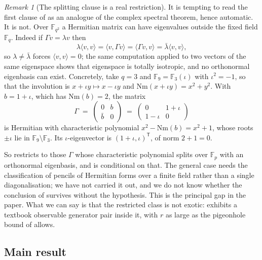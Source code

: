 \documentclass{ceurart}
\theoremstyle{plain}
\theoremstyle{definition}
\theoremstyle{remark}
\newtheorem{remark}[theorem]{Remark}
\theoremstyle{plain}
\newcommand{\inner}[2]{\langle #1, #2\rangle}
\newcommand{\FF}{\mathbb{F}}
\newcommand{\Nm}{\mathrm{Nm}}       %
\begin{document}
\begin{remark}[The splitting clause is a real restriction]
\label{rem:notspectral}
It is tempting to read the first clause of  as an analogue of
the complex spectral theorem, hence automatic. It is not. Over $\FF_{q^2}$ a
Hermitian matrix can have eigenvalues outside the fixed field $\FF_q$. Indeed
if $\Gamma v=\lambda v$ then
\[
  \lambda\inner vv=\inner v{\Gamma v}=\inner{\Gamma v}v=\bar\lambda\inner vv ,
\]
so $\lambda\ne\bar\lambda$ forces $\inner vv=0$; the same computation applied
to two vectors of the same eigenspace shows that eigenspace is totally
isotropic, and no orthonormal eigenbasis can exist. Concretely, take $q=3$ and
$\FF_9=\FF_3(\iota)$ with $\iota^2=-1$, so that the involution is
$x+\iota y\mapsto x-\iota y$ and $\Nm(x+\iota y)=x^2+y^2$. With $b=1+\iota$,
which has $\Nm(b)=2$, the matrix
\[
  \Gamma\;=\;\begin{pmatrix}0&b\\ \bar b&0\end{pmatrix}
  \;=\;\begin{pmatrix}0&1+\iota\\ 1-\iota&0\end{pmatrix}
\]
is Hermitian with characteristic polynomial $x^{2}-\Nm(b)=x^{2}+1$, whose roots
$\pm\iota$ lie in $\FF_9\setminus\FF_3$. Its $\iota$-eigenvector is
$(1+\iota,\iota)^{\mathsf T}$, of norm $2+1=0$.

So  restricts to those $\Gamma$ whose characteristic
polynomial splits over $\FF_p$ with an orthonormal eigenbasis, and
 is conditional on that. The general case needs the
classification of pencils of Hermitian forms over a finite field rather than a
single diagonalisation; we have not carried it out, and we do not know whether
the conclusion of  survives without the hypothesis. This is the
principal gap in the paper. What we can say is that the restricted class is not
exotic:  exhibits a textbook observable generator pair inside
it, with $r$ as large as the pigeonhole bound of  allows.
\end{remark}

\subsection{Main result}
\end{document}
